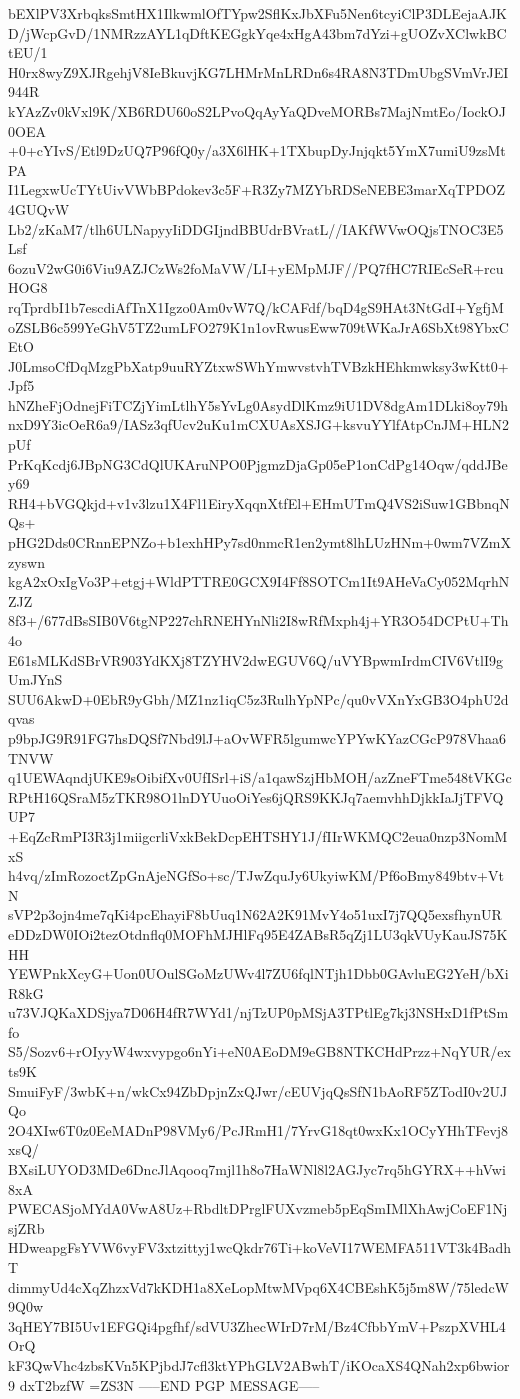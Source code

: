 bEXlPV3XrbqksSmtHX1IlkwmlOfTYpw2SflKxJbXFu5Nen6tcyiClP3DLEejaAJK
D/jWcpGvD/1NMRzzAYL1qDftKEGgkYqe4xHgA43bm7dYzi+gUOZvXClwkBCtEU/1
H0rx8wyZ9XJRgehjV8IeBkuvjKG7LHMrMnLRDn6s4RA8N3TDmUbgSVmVrJEI944R
kYAzZv0kVxl9K/XB6RDU60oS2LPvoQqAyYaQDveMORBs7MajNmtEo/IockOJ0OEA
+0+cYIvS/Etl9DzUQ7P96fQ0y/a3X6lHK+1TXbupDyJnjqkt5YmX7umiU9zsMtPA
I1LegxwUcTYtUivVWbBPdokev3c5F+R3Zy7MZYbRDSeNEBE3marXqTPDOZ4GUQvW
Lb2/zKaM7/tlh6ULNapyyIiDDGIjndBBUdrBVratL//IAKfWVwOQjsTNOC3E5Lsf
6ozuV2wG0i6Viu9AZJCzWs2foMaVW/LI+yEMpMJF//PQ7fHC7RIEcSeR+rcuHOG8
rqTprdbI1b7escdiAfTnX1Igzo0Am0vW7Q/kCAFdf/bqD4gS9HAt3NtGdI+YgfjM
oZSLB6c599YeGhV5TZ2umLFO279K1n1ovRwusEww709tWKaJrA6SbXt98YbxCEtO
J0LmsoCfDqMzgPbXatp9uuRYZtxwSWhYmwvstvhTVBzkHEhkmwksy3wKtt0+Jpf5
hNZheFjOdnejFiTCZjYimLtlhY5sYvLg0AsydDlKmz9iU1DV8dgAm1DLki8oy79h
nxD9Y3icOeR6a9/IASz3qfUcv2uKu1mCXUAsXSJG+ksvuYYlfAtpCnJM+HLN2pUf
PrKqKcdj6JBpNG3CdQlUKAruNPO0PjgmzDjaGp05eP1onCdPg14Oqw/qddJBey69
RH4+bVGQkjd+v1v3lzu1X4Fl1EiryXqqnXtfEl+EHmUTmQ4VS2iSuw1GBbnqNQs+
pHG2Dds0CRnnEPNZo+b1exhHPy7sd0nmcR1en2ymt8lhLUzHNm+0wm7VZmXzyswn
kgA2xOxIgVo3P+etgj+WldPTTRE0GCX9I4Ff8SOTCm1It9AHeVaCy052MqrhNZJZ
8f3+/677dBsSIB0V6tgNP227chRNEHYnNli2I8wRfMxph4j+YR3O54DCPtU+Th4o
E61sMLKdSBrVR903YdKXj8TZYHV2dwEGUV6Q/uVYBpwmIrdmCIV6VtlI9gUmJYnS
SUU6AkwD+0EbR9yGbh/MZ1nz1iqC5z3RulhYpNPc/qu0vVXnYxGB3O4phU2dqvas
p9bpJG9R91FG7hsDQSf7Nbd9lJ+aOvWFR5lgumwcYPYwKYazCGcP978Vhaa6TNVW
q1UEWAqndjUKE9sOibifXv0UfISrl+iS/a1qawSzjHbMOH/azZneFTme548tVKGc
RPtH16QSraM5zTKR98O1lnDYUuoOiYes6jQRS9KKJq7aemvhhDjkkIaJjTFVQUP7
+EqZcRmPI3R3j1miigcrliVxkBekDcpEHTSHY1J/fIIrWKMQC2eua0nzp3NomMxS
h4vq/zImRozoctZpGnAjeNGfSo+sc/TJwZquJy6UkyiwKM/Pf6oBmy849btv+VtN
sVP2p3ojn4me7qKi4pcEhayiF8bUuq1N62A2K91MvY4o51uxI7j7QQ5exsfhynUR
eDDzDW0IOi2tezOtdnflq0MOFhMJHlFq95E4ZABsR5qZj1LU3qkVUyKauJS75KHH
YEWPnkXcyG+Uon0UOulSGoMzUWv4l7ZU6fqlNTjh1Dbb0GAvluEG2YeH/bXiR8kG
u73VJQKaXDSjya7D06H4fR7WYd1/njTzUP0pMSjA3TPtlEg7kj3NSHxD1fPtSmfo
S5/Sozv6+rOIyyW4wxvypgo6nYi+eN0AEoDM9eGB8NTKCHdPrzz+NqYUR/exts9K
SmuiFyF/3wbK+n/wkCx94ZbDpjnZxQJwr/cEUVjqQsSfN1bAoRF5ZTodI0v2UJQo
2O4XIw6T0z0EeMADnP98VMy6/PcJRmH1/7YrvG18qt0wxKx1OCyYHhTFevj8xsQ/
BXsiLUYOD3MDe6DncJlAqooq7mjl1h8o7HaWNl8l2AGJyc7rq5hGYRX++hVwi8xA
PWECASjoMYdA0VwA8Uz+RbdltDPrglFUXvzmeb5pEqSmIMlXhAwjCoEF1NjsjZRb
HDweapgFsYVW6vyFV3xtzittyj1wcQkdr76Ti+koVeVI17WEMFA511VT3k4BadhT
dimmyUd4cXqZhzxVd7kKDH1a8XeLopMtwMVpq6X4CBEshK5j5m8W/75ledcW9Q0w
3qHEY7BI5Uv1EFGQi4pgfhf/sdVU3ZhecWIrD7rM/Bz4CfbbYmV+PszpXVHL4OrQ
kF3QwVhc4zbsKVn5KPjbdJ7cfl3ktYPhGLV2ABwhT/iKOcaXS4QNah2xp6bwior9
dxT2bzfW
=ZS3N
-----END PGP MESSAGE-----
